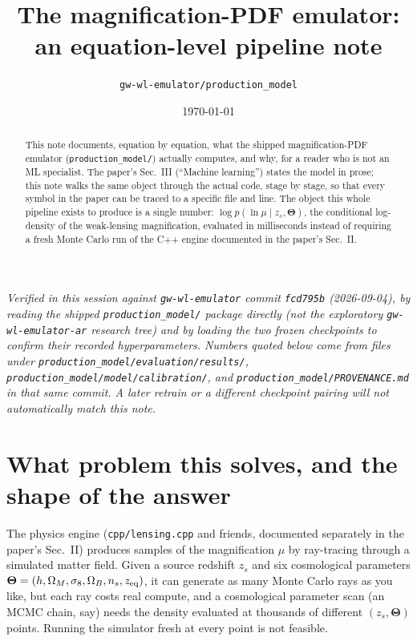 \documentclass[11pt]{article}
\title{The magnification-PDF emulator: an equation-level pipeline note}
\author{\texttt{gw-wl-emulator/production\_model}}
\date{\today}
\newcommand{\code}[1]{\texttt{#1}}
\newcommand{\file}[1]{\texttt{#1}}
\newcommand{\vect}[1]{\boldsymbol{#1}}
\begin{document}
\maketitle

\noindent\textit{Verified in this session against \code{gw-wl-emulator} commit
\code{fcd795b} (2026-09-04), by reading the shipped
\code{production\_model/} package directly (not the exploratory
\code{gw-wl-emulator-ar} research tree) and by loading the two frozen
checkpoints to confirm their recorded hyperparameters. Numbers quoted below
come from files under \code{production\_model/evaluation/results/},
\code{production\_model/model/calibration/}, and
\code{production\_model/PROVENANCE.md} in that same commit. A later retrain
or a different checkpoint pairing will not automatically match this note.}

\begin{abstract}
This note documents, equation by equation, what the shipped magnification-PDF
emulator (\code{production\_model/}) actually computes, and why, for a reader
who is not an ML specialist. The paper's Sec.~III (``Machine learning'')
states the model in prose; this note walks the same object through the
actual code, stage by stage, so that every symbol in the paper can be traced
to a specific file and line. The object this whole pipeline exists to
produce is a single number: $\log p(\ln\mu \mid z_s, \vect\Theta)$, the
conditional log-density of the weak-lensing magnification, evaluated in
milliseconds instead of requiring a fresh Monte Carlo run of the C++ engine
documented in the paper's Sec.~II.
\end{abstract}

\tableofcontents

\section{What problem this solves, and the shape of the answer}

The physics engine (\file{cpp/lensing.cpp} and friends, documented
separately in the paper's Sec.~II) produces samples of the magnification
$\mu$ by ray-tracing through a simulated matter field. Given a source
redshift $z_s$ and six cosmological parameters
$\vect\Theta = (h,\Omega_M,\sigma_8,\Omega_B,n_s,z_{\rm eq})$, it can generate
as many Monte Carlo rays as you like, but each ray costs real compute, and a
cosmological parameter scan (an MCMC chain, say) needs the density evaluated
at thousands of different $(z_s,\vect\Theta)$ points. Running the simulator
fresh at every point is not feasible.
\end{document}
